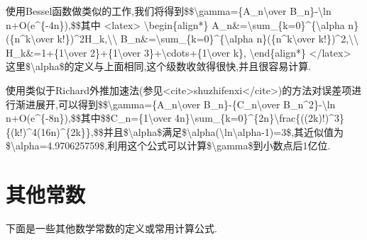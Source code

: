 \documentclass[
]{article}
\begin{document}
使用Bessel函数做类似的工作,我们将得到\$\$\textbackslash gamma=\{A\_n\textbackslash over
B\_n\}-\textbackslash ln n+O(e\^{}\{-4n\}),\$\$其中
\textless latex\textgreater{} \textbackslash begin\{align*\}
A\_n\&=\textbackslash sum\_\{k=0\}\^{}\{\textbackslash alpha
n\}(\{n\^{}k\textbackslash over
k!\})\^{}2H\_k,\textbackslash\textbackslash{}
B\_n\&=\textbackslash sum\_\{k=0\}\^{}\{\textbackslash alpha
n\}(\{n\^{}k\textbackslash over
k!\})\^{}2,\textbackslash\textbackslash{}
H\_k\&=1+\{1\textbackslash over 2\}+\{1\textbackslash over
3\}+\textbackslash cdots+\{1\textbackslash over k\},
\textbackslash end\{align*\} \textless/latex\textgreater{}
这里\$\textbackslash alpha\$的定义与上面相同,这个级数收敛得很快,并且很容易计算.

使用类似于Richard外推加速法(参见\textless cite\textgreater shuzhifenxi\textless/cite\textgreater)的方法对误差项进行渐进展开,可以得到\$\$\textbackslash gamma=\{A\_n\textbackslash over
B\_n\}-\{C\_n\textbackslash over B\_n\^{}2\}-\textbackslash ln
n+O(e\^{}\{-8n\}),\$\$其中\$\$C\_n=\{1\textbackslash over
4n\}\textbackslash sum\_\{k=0\}\^{}\{2n\}\textbackslash frac\{((2k)!)\^{}3\}\{(k!)\^{}4(16n)\^{}\{2k\}\},\$\$并且\$\textbackslash alpha\$满足\$\textbackslash alpha(\textbackslash ln\textbackslash alpha-1)=3\$,其近似值为\$\textbackslash alpha=4.970625759\$,利用这个公式可以计算\$\textbackslash gamma\$到小数点后1亿位.

\hypertarget{ux5176ux4ed6ux5e38ux6570}{%
\section{其他常数}\label{ux5176ux4ed6ux5e38ux6570}}

下面是一些其他数学常数的定义或常用计算公式.
\end{document}
